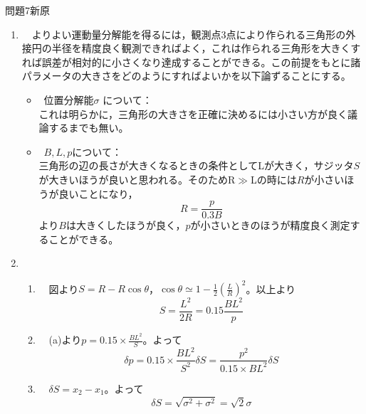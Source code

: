 \documentclass[fleqn]{jbook}
\def\ds{\displaystyle}
\begin{document}
\begin{answer}{問題7}{新原}
\setcounter{equation}{0}



\begin{enumerate}

  \item 　よりよい運動量分解能を得るには，観測点3点により作られる三角形の外接円の半径を精度良く観測できればよく，これは作られる三角形を大きくすれば誤差が相対的に小さくなり達成することができる。この前提をもとに諸パラメータの大きさをどのようにすればよいかを以下論ずることにする。
  
  \begin{itemize}
    \item ~位置分解能$\sigma$ について：\\
    これは明らかに，三角形の大きさを正確に決めるには小さい方が良く議論するまでも無い。
    \item ~$B,L,p$について：\\
    三角形の辺の長さが大きくなるときの条件としてLが大きく，サジッタ$S$が大きいほうが良いと思われる。そのためR$\gg$Lの時には$R$が小さいほうが良いことになり，
\begin{equation}
R = \frac{p}{0.3B}
\end{equation}
より$B$は大きくしたほうが良く，$p$が小さいときのほうが精度良く測定することができる。

  \end{itemize}
  

  \item 　
  \begin{enumerate}
    
    \item 　図より$S = R -R\cos\theta$，$\ds \cos\theta \simeq 1 - \frac{1}{2} \left(\frac{L}{R}\right)^2$。以上より
\begin{equation}
S = \frac{L^2}{2R} = 0.15 \frac{BL^2}{p}
\end{equation}
    
    
    \item 　(a)より$\ds p = 0.15 \times \frac{BL^2}{S}$。よって
\begin{equation}
\delta p = 0.15 \times \frac{BL^2}{S^2} \delta S = \frac{p^2}{0.15 \times BL^2} \delta S
\end{equation}
    
    \item 　$\delta S = x_2 - x_1$。よって
\begin{equation}
\delta S = \sqrt{\sigma ^2 + \sigma ^2} 
= \sqrt{2} \sigma
\end{equation}


\end{enumerate}
\end{enumerate}
\end{answer}
\end{document}
